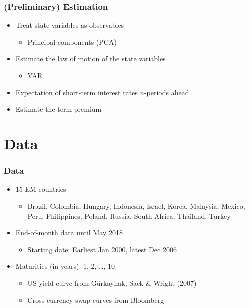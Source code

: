 \documentclass[12pt, xcolor=dvipsnames]{beamer} 			         %
\begin{document}
\begin{frame}
	\frametitle{(Preliminary) Estimation}
	\begin{itemize}
		\item Treat state variables as observables
		\begin{itemize}
			\item Principal components (PCA)
		\end{itemize}
		\item Estimate the law of motion of the state variables
				\begin{itemize}
			\item VAR
		\end{itemize}
		\item Expectation of short-term interest rates $n$-periods ahead
		\item Estimate the term premium
	\end{itemize}
\end{frame}


\section{Data}

\begin{frame}
	\frametitle{Data}
	\begin{itemize}
		\item 15 EM countries
		\begin{itemize}
			\item \scriptsize Brazil, Colombia, Hungary, Indonesia, Israel, Korea, Malaysia, Mexico, Peru, Philippines, Poland, Russia, South Africa, Thailand, Turkey
		\end{itemize}
		\item<2-> End-of-month data until May 2018
		\begin{itemize}
			\item<2-> Starting date: Earliest Jan 2000, latest Dec 2006
		\end{itemize}
		\item<3-> Maturities (in years): 1, 2, \ldots, 10 
		\begin{itemize}
			\item<3-> US yield curve from Gürkaynak, Sack \& Wright (2007)
			\item<3-> Cross-currency swap curves from Bloomberg
		\end{itemize}
	\end{itemize}
\end{frame}
\end{document}
